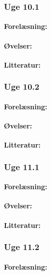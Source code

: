 \documentclass[12pt]{article}
\begin{document}
\subsubsection{Uge 10.1}
\paragraph{Forelæsning:} 
\paragraph{Øvelser:}
\paragraph{Litteratur:}
\subsubsection{Uge 10.2}
\paragraph{Forelæsning:} 
\paragraph{Øvelser:}
\paragraph{Litteratur:}

\subsubsection{Uge 11.1}
\paragraph{Forelæsning:} 
\paragraph{Øvelser:}
\paragraph{Litteratur:}
\subsubsection{Uge 11.2}
\paragraph{Forelæsning:} 
\end{document}
